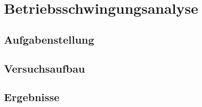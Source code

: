 \chapter{Betriebsschwingungsanalyse}
\label{sec: Hauptkapitel 2}


\section{Aufgabenstellung}

\section{Versuchsaufbau}

\section{Ergebnisse}


